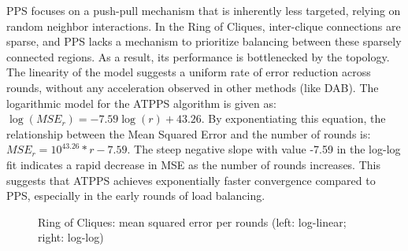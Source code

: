 PPS focuses on a push-pull mechanism that is inherently less targeted, relying on random neighbor interactions.
In the Ring of Cliques, inter-clique connections are sparse, and PPS lacks a mechanism to prioritize balancing between these sparsely connected regions. As a result, its performance is bottlenecked by the topology. The linearity of the model suggests a uniform rate of error reduction across rounds, without any acceleration observed in other methods (like DAB). The logarithmic model for the ATPPS algorithm is given as:
$\log{(MSE_r)}=-7.59\log{(r)}+43.26$. By exponentiating this equation, the relationship between the Mean Squared Error and the number of rounds is: $MSE_r=10^{43.26}*r-7.59$. The steep negative slope with value -7.59 in the log-log fit indicates a rapid decrease in MSE as the number of rounds increases. This suggests that ATPPS achieves exponentially faster convergence compared to PPS, especially in the early rounds of load balancing.

\begin{figure}[!ht]
    \centering
    \hfil
    \caption{Ring of Cliques: mean squared error per rounds (left: log-linear; right: log-log)}
        \label{fig:atppsRingOfCliquesLog_LogLog}
\end{figure}


